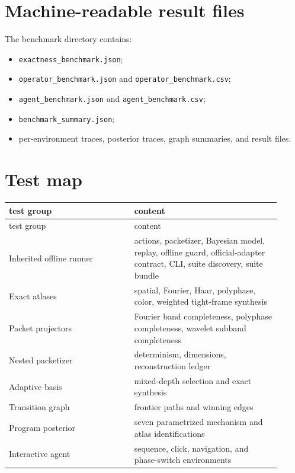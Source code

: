 \documentclass[11pt]{article}
\theoremstyle{remark}
\begin{document}
\section{Machine-readable result files}

The benchmark directory contains:
\begin{itemize}
\item \texttt{exactness\_benchmark.json};
\item \texttt{operator\_benchmark.json} and \texttt{operator\_benchmark.csv};
\item \texttt{agent\_benchmark.json} and \texttt{agent\_benchmark.csv};
\item \texttt{benchmark\_summary.json};
\item per-environment traces, posterior traces, graph summaries, and result files.
\end{itemize}

\section{Test map}

\begin{longtable}{L{0.42\linewidth}L{0.49\linewidth}}
\toprule
test group&content\\
\midrule
\endfirsthead
\toprule
test group&content\\
\midrule
\endhead
Inherited offline runner&actions, packetizer, Bayesian model, replay, offline guard, official-adapter contract, CLI, suite discovery, suite bundle\\
Exact atlases&spatial, Fourier, Haar, polyphase, color, weighted tight-frame synthesis\\
Packet projectors&Fourier band completeness, polyphase completeness, wavelet subband completeness\\
Nested packetizer&determinism, dimensions, reconstruction ledger\\
Adaptive basis&mixed-depth selection and exact synthesis\\
Transition graph&frontier paths and winning edges\\
Program posterior&seven parametrized mechanism and atlas identifications\\
Interactive agent&sequence, click, navigation, and phase-switch environments\\
\bottomrule
\end{longtable}
\end{document}
